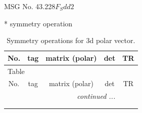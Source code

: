 \documentclass[fleqn,8pt]{jsarticle}
\begin{document}
\setcounter{MaxMatrixCols}{32}

\renewcommand{\tablename}{Table~}
\renewcommand{\figurename}{Figure~}
\begin{center}
\LARGE
MSG No. 43.228\quad$F_{S}dd2$
\end{center}
* symmetry operation
\renewcommand{\arraystretch}{1.3}
\begin{longtable}{ccccc}
\caption{Symmetry operations for 3d polar vector.}
 \\
 \hline \hline
No. & tag & matrix (polar) & det & TR \\ \hline \endfirsthead

\multicolumn{4}{l}{\tablename\ \thetable{}} \\
 \hline \hline
No. & tag & matrix (polar) & det & TR \\ \hline \endhead

 \hline \hline
\multicolumn{4}{r}{\footnotesize\it continued ...} \\ \endfoot

 \hline \hline
\multicolumn{4}{r}{} \\ \endlastfoot


\end{longtable}
\end{document}
